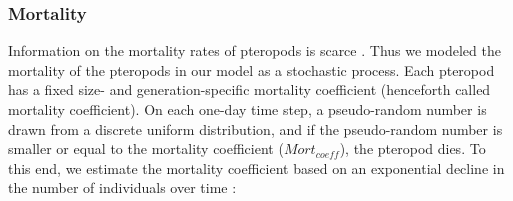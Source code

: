 


\subsubsection{Mortality}
Information on the mortality rates of pteropods is scarce \citep{Lischka2011WarmingAcidificationJuveniles,Bednarsek2012Population,Bednarsek2016CumulativeEffects}. Thus we modeled the mortality of the pteropods in our model as a stochastic process. Each pteropod has a fixed size- and generation-specific mortality coefficient (henceforth called mortality coefficient). On each one-day time step, a pseudo-random number is drawn from a discrete uniform distribution, and if the pseudo-random number is smaller or equal to the mortality coefficient ($Mort_{coeff}$), the pteropod dies. To this end, we estimate the mortality coefficient based on an exponential decline in the number of individuals over time \citep{Bednarsek2012Population,Bednarsek2016CumulativeEffects}:

